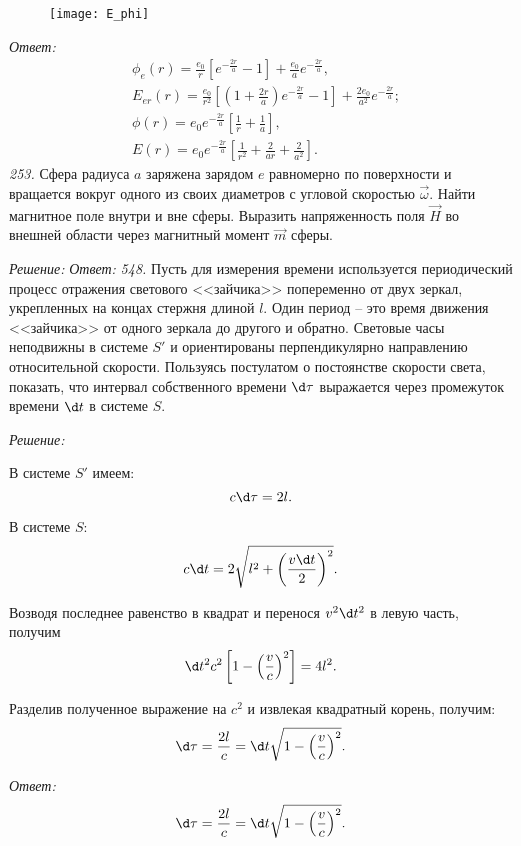     \begin{figure}[h!]
        \center
        \texttt{[image: E\_phi]}
    \end{figure}

\vspace*{2em}        
\emph{Ответ:}
    \begin{align*}
        & \phi_e(r) = \frac{e_0}{r}\left[e^{-\frac{2r}{a}} - 1\right] +
        \frac{e_0}{a}e^{-\frac{2r}{a}}, \\
        & E_{er}(r) = \frac{e_0}{r^2}\left[\left(1 + \frac{2r}{a}\right)
        e^{-\frac{2r}{a}} - 1\right] + \frac{2e_0}{a^2}e^{-\frac{2r}{a}}; \\
        & \phi(r) = e_0e^{-\frac{2r}{a}}\left[\frac{1}{r} + \frac{1}{a}\right], \\
        & E(r) = e_0e^{-\frac{2r}{a}}\left[\frac{1}{r^2} + \frac{2}{ar} +
        \frac{2}{a^2}\right].
    \end{align*}
\newpage
\emph{253.} Сфера радиуса \( a \) заряжена зарядом \( e \) равномерно по
поверхности и вращается вокруг одного из своих диаметров с угловой скоростью
\( \vec{\omega} \). Найти магнитное поле внутри и вне сферы. Выразить
напряженность поля \( \vec{H} \) во внешней области через магнитный момент
\( \vec{m} \) сферы.

\vspace*{2em}
\emph{Решение:}
\vfill
\emph{Ответ:}
\newpage
\emph{548.} Пусть для измерения времени используется периодический процесс
отражения светового <<зайчика>> попеременно от двух зеркал, укрепленных на
концах стержня длиной \( l \). Один период -- это время движения <<зайчика>> от
одного зеркала до другого и обратно. Световые часы неподвижны в системе \( S' \)
и ориентированы перпендикулярно направлению относительной скорости.
Пользуясь постулатом о постоянстве скорости света, показать, что интервал
собственного времени \( \d\tau \) выражается через промежуток времени \( \d t \)
в системе \( S \).

\vspace*{2em}
\emph{Решение:}
    
    В системе \( S' \) имеем:
    \[
        c\d\tau = 2l.
    \]
    
    В системе \( S \):
    \[
        c\d t = 2\sqrt{l^2 + \left(\frac{v\d t}{2}\right)^2}.
    \]
    
    Возводя последнее равенство в квадрат и перенося \( v^2\d t^2 \) в левую часть,
    получим
    \[
        \d t^2c^2\left[1 - \left(\frac{v}{c}\right)^2\right] = 4l^2.
    \]
    
    Разделив полученное выражение на \( c^2 \) и извлекая квадратный корень,
    получим:
    \[
        \d\tau = \frac{2l}{c} = \d t\sqrt{1 - \left(\frac{v}{c}\right)^2}.
    \]
    
\vfill
\emph{Ответ:}
    \[
        \d\tau = \frac{2l}{c} = \d t\sqrt{1 - \left(\frac{v}{c}\right)^2}.
    \]

